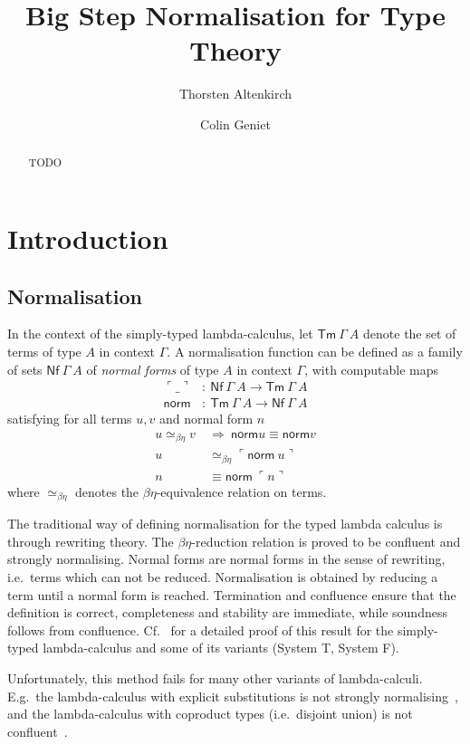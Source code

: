 \documentclass[a4paper,english,cleveref,autoref,draft]{lipics-v2019}
\title{Big Step Normalisation for Type Theory}
\author{Thorsten Altenkirch}
{School for Computer Science, University of Nottingham, United Kingdom}
{txa@cs.nott.ac.uk}{}{}
\author{Colin Geniet}
{Departement of Informatics, ENS Paris-Saclay, France}
{colin.geniet@ens-paris-saclay.fr}{}{}
\newcommand{\agdaSymb}[1]{\mathsf{#1}}
\newcommand{\Tm}{\agdaSymb{Tm}}
\newcommand{\Nf}{\agdaSymb{Nf}}
\newcommand{\norm}{\agdaSymb{norm}}
\newcommand{\cul}{\ulcorner}
\newcommand{\cur}{\urcorner}
\newcommand{\Beq}{\simeq_{\beta\eta}}
\begin{document}
\maketitle

\begin{abstract}
TODO
\end{abstract}

\section{Introduction}
\subsection{Normalisation}
In the context of the simply-typed lambda-calculus, let $\Tm\ \Gamma\ A$ denote
the set of terms of type $A$ in context $\Gamma$. A normalisation function can be
defined as a family of sets $\Nf\ \Gamma\ A$ of \emph{normal forms} of type
$A$ in context $\Gamma$, with computable maps
\begin{align}
  \cul \_ \cur &:\ \Nf\ \Gamma\ A → \Tm\ \Gamma\ A \tag{embedding} \\
  \norm        &:\ \Tm\ \Gamma\ A → \Nf\ \Gamma\ A \tag{normalisation}
\end{align}
satisfying for all terms $u,v$ and normal form $n$
\begin{align}
  u \Beq v \ &\Rightarrow \ \norm u \equiv \norm v \tag{soundness} \\
  u &\Beq \cul \norm\ u \cur \tag{completeness} \\
  n &\equiv \norm\ \cul n \cur  \tag{stability}
\end{align}
where $\Beq$ denotes the $\beta\eta$-equivalence relation on terms.

The traditional way of defining normalisation for the typed lambda calculus is
through rewriting theory. The $\beta\eta$-reduction relation is proved to be
confluent and strongly normalising. Normal forms are normal forms in the sense
of rewriting, i.e.\ terms which can not be reduced. Normalisation is obtained by
reducing a term until a normal form is reached. Termination and confluence
ensure that the definition is correct, completeness and stability are immediate,
while soundness follows from confluence. Cf.~\cite{girard1989proofs} for a
detailed proof of this result for the simply-typed lambda-calculus and some of
its variants (System T, System F).

Unfortunately, this method fails for many other variants of lambda-calculi.
E.g.\ the lambda-calculus with explicit substitutions is not strongly
normalising~\cite{mellies1995explicit}, and the lambda-calculus with
coproduct types (i.e.\ disjoint union) is not confluent~\cite{dougherty1995coproducts}.
\end{document}

